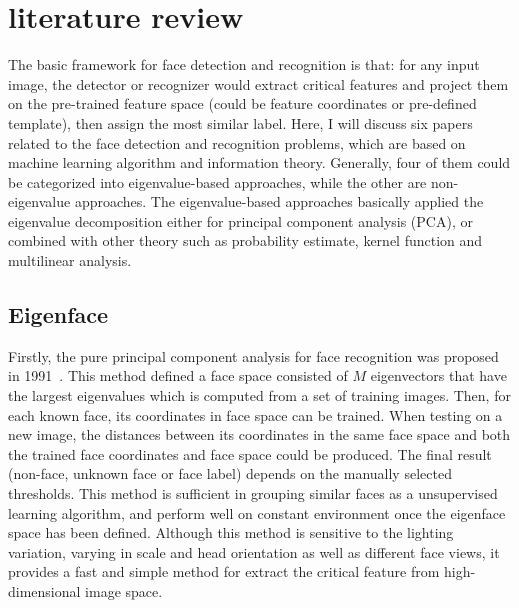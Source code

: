 \documentclass[12pt, a4paper, twoside]{article}
\begin{document}
\section{literature review}
The basic framework for face detection and recognition is that: for any input image, the detector or recognizer would extract critical features and project them on the pre-trained feature space (could be feature coordinates or pre-defined template), then assign the most similar label. Here, I will discuss six papers related to the face detection and recognition problems, which are based on machine learning algorithm and information theory. Generally, four of them could be categorized into eigenvalue-based approaches, while the other are non-eigenvalue approaches. The eigenvalue-based approaches basically applied the eigenvalue decomposition either for principal component analysis (PCA), or combined with other theory such as probability estimate, kernel function and multilinear analysis.

\subsection{Eigenface}
Firstly, the pure principal component analysis for face recognition was proposed in 1991~\cite{turk1991eigenfaces}. This method defined a face space consisted of $M$ eigenvectors that have the largest eigenvalues which is computed from a set of training images. Then, for each known face, its coordinates in face space can be trained. When testing on a new image,  the distances between its coordinates in the same face space and both the trained face coordinates and face space could be produced. The final result (non-face, unknown face or face label) depends on the manually selected thresholds. This method is sufficient in grouping similar faces as a unsupervised learning algorithm, and perform well on constant environment once the eigenface space has been defined. Although this method is sensitive to the lighting variation, varying in scale and head orientation as well as different face views, it provides a fast and simple method for extract the critical feature from high-dimensional image space.
\end{document}
